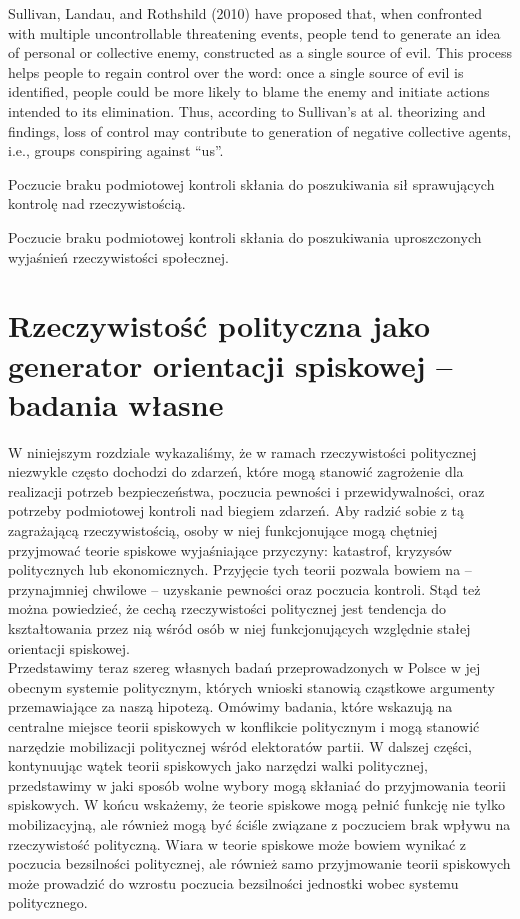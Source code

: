 \documentclass[man]{apa6}
\begin{document}
Sullivan, Landau, and Rothshild  (2010) have proposed that, when confronted with multiple uncontrollable threatening events, people tend to generate an idea of personal or collective enemy, constructed as a single source of evil. This process helps people to regain control over the word: once a single source of evil is identified, people could be more likely to blame the enemy and initiate actions intended to its elimination. Thus, according to Sullivan’s at al. theorizing and findings, loss of control may contribute to generation of negative collective agents, i.e., groups conspiring against ``us''.


    Poczucie braku podmiotowej kontroli skłania do poszukiwania sił sprawujących kontrolę nad rzeczywistością.

    Poczucie braku podmiotowej kontroli skłania do poszukiwania uproszczonych wyjaśnień rzeczywistości społecznej.

    \section{Rzeczywistość polityczna jako generator orientacji spiskowej -- badania własne}

    W niniejszym rozdziale wykazaliśmy, że w ramach rzeczywistości politycznej niezwykle często dochodzi do zdarzeń, które mogą stanowić zagrożenie dla realizacji potrzeb bezpieczeństwa, poczucia pewności i przewidywalności, oraz potrzeby podmiotowej kontroli nad biegiem zdarzeń. Aby radzić sobie z tą zagrażającą rzeczywistością, osoby w niej funkcjonujące mogą chętniej przyjmować teorie spiskowe wyjaśniające przyczyny: katastrof, kryzysów politycznych lub ekonomicznych. Przyjęcie tych teorii pozwala bowiem na -- przynajmniej chwilowe -- uzyskanie pewności oraz  poczucia kontroli. Stąd też można powiedzieć, że cechą rzeczywistości politycznej jest tendencja do kształtowania przez nią wśród osób w niej funkcjonujących względnie stałej orientacji spiskowej.\\
    Przedstawimy teraz szereg własnych badań przeprowadzonych w Polsce w jej obecnym systemie politycznym, których wnioski stanowią cząstkowe argumenty przemawiające za naszą hipotezą. Omówimy badania, które wskazują na centralne miejsce teorii spiskowych w konflikcie politycznym i mogą stanowić narzędzie mobilizacji politycznej wśród elektoratów partii. W dalszej części, kontynuując wątek teorii spiskowych jako narzędzi walki politycznej, przedstawimy w jaki sposób wolne wybory mogą skłaniać do przyjmowania teorii spiskowych. W końcu wskażemy, że teorie spiskowe mogą pełnić funkcję nie tylko mobilizacyjną, ale również mogą być ściśle związane z poczuciem brak wpływu na rzeczywistość polityczną. Wiara w teorie spiskowe może bowiem wynikać z poczucia bezsilności politycznej, ale również samo przyjmowanie teorii spiskowych może prowadzić do wzrostu poczucia bezsilności jednostki wobec systemu politycznego.
\end{document}
